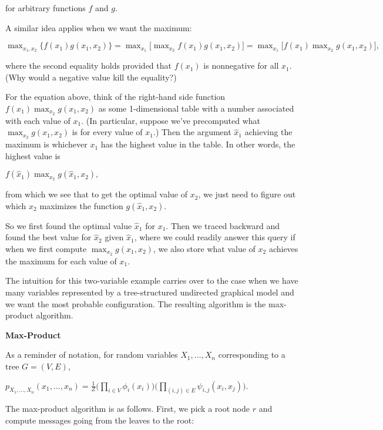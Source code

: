 \documentclass[6008notes.tex]{subfiles}
\begin{document}
for arbitrary functions $f$ and $g$.

A similar idea applies when we want the maximum:

{\centering$\max _{x_1, x_2}\{ f(x_1)g(x_1,x_2)\}  = \max _{x_1}\Big[ \max _{x_2} f(x_1)g(x_1,x_2) \Big] = \max _{x_1}\Big[ f(x_1) \max _{x_2} g(x_1,x_2) \Big],$ \par}
 
where the second equality holds provided that $f(x_1)$ is nonnegative for all $x_1$. (Why would a negative value kill the equality?)

For the equation above, think of the right-hand side function $f(x_1) \max _{x_2} g(x_1,x_2)$ as some 1-dimensional table with a number associated with each value of $x_1$. (In particular, suppose we've precomputed what $\max _{x_2} g(x_1, x_2)$ is for every value of $x_1$.) Then the argument $\hat{x}_1$ achieving the maximum is whichever $x_1$ has the highest value in the table. In other words, the highest value is

{\centering$f(\hat{x}_1) \max _{x_2} g(\hat{x}_1,x_2),$ \par}
 
from which we see that to get the optimal value of $x_2$, we just need to figure out which $x_2$ maximizes the function $g(\hat{x}_1,x_2)$.

So we first found the optimal value $\hat{x}_1$ for $x_1$. Then we traced backward and found the best value for $\hat{x}_2$ given $\hat{x}_1$, where we could readily answer this query if when we first compute $\max _{x_2} g(x_1, x_2)$, we also store what value of $x_2$ achieves the maximum for each value of $x_1$.

The intuition for this two-variable example carries over to the case when we have many variables represented by a tree-structured undirected graphical model and we want the most probable configuration. The resulting algorithm is the max-product algorithm.

\textbf{Max-Product}

As a reminder of notation, for random variables $X_1,\dots ,X_ n$ corresponding to a tree $G=(V,E)$,

{\centering$p_{X_1,\dots ,X_ n}(x_1,\dots ,x_ n) = \frac{1}{Z} \Bigg( \prod _{i\in V} \phi _ i(x_ i) \Bigg) \Bigg( \prod _{(i,j)\in E} \psi _{i,j}(x_ i, x_ j) \Bigg).$ \par}
 
The max-product algorithm is as follows. First, we pick a root node $r$ and compute messages going from the leaves to the root:
\end{document}
